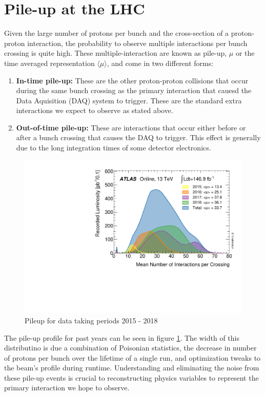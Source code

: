 \section{Pile-up at the LHC} \label{sec:lhc:pileup}

Given the large number of protons per bunch and the cross-section of a
proton-proton interaction, the probability to observe multiple interactions per
bunch crossing is quite high.  These multiple-interaction are known as pile-up,
$\mu$ or the time averaged representation $\langle \mu \rangle$, and come in two
different forms: 

\begin{enumerate} \item \textbf{In-time pile-up:} These are the other
proton-proton collisions that occur during the same bunch crossing as the
primary interaction that cauesd the Data Aquisition (DAQ) system to trigger.
These are the standard extra interactions we expect to observe as stated above.
\item \textbf{Out-of-time pile-up:} These are interactions that occur either
before or after a bunch crossing that causes the DAQ to trigger.  This effect is
generally due to the long integration times of some detector electronics.
\end{enumerate}

\begin{figure}[!htbp] 
  \begin{center}
    \includegraphics[width=0.9\linewidth]{figures/lhc/pileup.pdf}
    \caption{ Pileup for data taking periods 2015 - 2018} 
    \label{fig:pileup} 
  \end{center} 
\end{figure}

The pile-up profile for past years can be seen in figure \ref{fig:pileup}.  The width of this
distributino is due a combination of Poisonian statistics, the decrease in
number of protons per bunch over the lifetime of a single run, and optimization
tweaks to the beam's profile during runtime.  Understanding and eliminating the
noise from these pile-up events is crucial to reconstructing physics variables
to represent the primary interaction we hope to observe.
